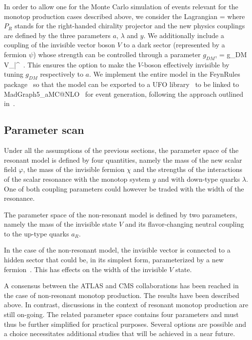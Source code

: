      In order to allow one for the Monte Carlo simulation of events relevant for
     the monotop production cases described above, we consider the Lagrangian
     \be
       \lag =
     \ee
     where $P_R$ stands for the right-handed chirality projector and the new
     physics couplings are defined by the three parameters $a$, $\lambda$ and
     $y$. We additionally include a coupling of the invisible vector boson $V$
     to a dark sector (represented by a fermion $\psi$) whose strength can be
     controlled through a parameter $g_{DM}$,
     \be
       \lag = g_{DM} V_\mu \bar\psi \gamma^\mu\psi \ .
     \ee
     This ensures the option to make the $V$-boson effectively invisible by
     tuning $g_{DM}$ respectively to $a$. We implement the entire model in the
     {\sc FeynRules} package~\cite{Alloul:2013bka} so that the model can be
     exported to a UFO library~\cite{Degrande:2011ua} to be linked to
     {\sc MadGraph5\_aMC@NLO}~\cite{Alwall:2014hca} for event generation,
     following the approach outlined in~\cite{Christensen:2009jx}.


\subsection{Parameter scan}

Under all the assumptions of the previous sections, the parameter space of
the resonant model is defined by four quantities, namely the mass of the
new scalar field $\varphi$, the mass of the invisible fermion $\chi$ and
the strengths of the interactions of the scalar resonance with the monotop
system $y$ and with down-type quarks $\lambda$. One of both coupling
parameters could however be traded with the width of the resonance.

The parameter space of the non-resonant model is defined by two
parameters, namely the mass of the invisible state $V$ and its
flavor-changing neutral coupling to the up-type quarks $a_R$.

In the case of the non-resonant model, the invisible vector is connected to
a hidden sector that could be, in its simplest form, parameterized by a new
fermion~\cite{Boucheneb:2014wza}. This has effects on the width of the invisible $V$ state.


A consensus between the ATLAS and CMS collaborations has been reached in
the case of non-resonant monotop production. The results have been
described above. In contrast, discussions in the context of resonant
monotop production are still on-going. The related parameter space
contains four parameters and must thus be further simplified for practical
purposes. Several options are possible and a choice necessitates additional
studies that will be achieved in a near future.



